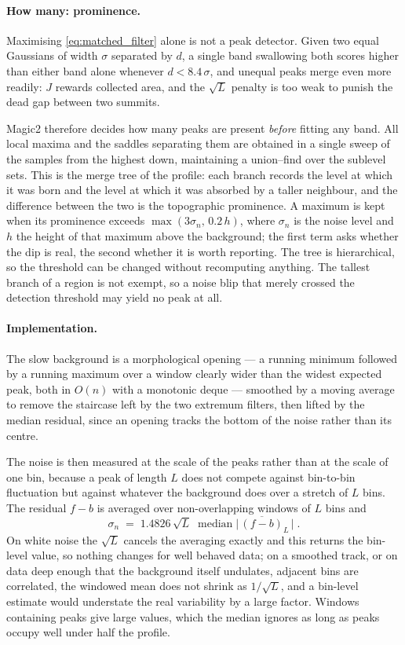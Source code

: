 \documentclass[11pt]{article}
\begin{document}
\paragraph{How many: prominence.}
Maximising \eqref{eq:matched_filter} alone is not a peak detector. Given
two equal Gaussians of width $\sigma$ separated by $d$, a single band
swallowing both scores higher than either band alone whenever
$d < 8.4\,\sigma$, and unequal peaks merge even more readily: $J$ rewards
collected area, and the $\sqrt{L}$ penalty is too weak to punish the
dead gap between two summits.

Magic2 therefore decides how many peaks are present \emph{before}
fitting any band. All local maxima and the saddles separating them are
obtained in a single sweep of the samples from the highest down,
maintaining a union--find over the sublevel sets. This is the merge tree
of the profile: each branch records the level at which it was born and
the level at which it was absorbed by a taller neighbour, and the
difference between the two is the topographic prominence. A maximum is
kept when its prominence exceeds $\max(3\sigma_n,\,0.2\,h)$, where
$\sigma_n$ is the noise level and $h$ the height of that maximum above
the background; the first term asks whether the dip is real, the second
whether it is worth reporting. The tree is hierarchical, so the
threshold can be changed without recomputing anything. The tallest
branch of a region is not exempt, so a noise blip that merely crossed
the detection threshold may yield no peak at all.

\paragraph{Implementation.}
The slow background is a morphological opening --- a running minimum
followed by a running maximum over a window clearly wider than the
widest expected peak, both in $O(n)$ with a monotonic deque --- smoothed
by a moving average to remove the staircase left by the two extremum
filters, then lifted by the median residual, since an opening tracks the
bottom of the noise rather than its centre.

The noise is then measured at the scale of the peaks rather than at the
scale of one bin, because a peak of length $L$ does not compete against
bin-to-bin fluctuation but against whatever the background does over a
stretch of $L$ bins. The residual $f - b$ is averaged over
non-overlapping windows of $L$ bins and
\begin{equation}
  \sigma_n \;=\; 1.4826\,\sqrt{L}\;
  \operatorname{median}\bigl|\,\overline{(f-b)}_L\,\bigr|\;.
  \label{eq:peak_sigma}
\end{equation}
On white noise the $\sqrt{L}$ cancels the averaging exactly and this
returns the bin-level value, so nothing changes for well behaved data;
on a smoothed track, or on data deep enough that the background itself
undulates, adjacent bins are correlated, the windowed mean does not
shrink as $1/\sqrt{L}$, and a bin-level estimate would understate the
real variability by a large factor. Windows containing peaks give large
values, which the median ignores as long as peaks occupy well under half
the profile.
\end{document}

